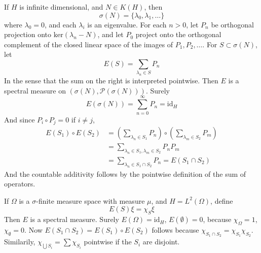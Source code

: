 \begin{example}
    If $H$ is infinite dimensional, and $N \in K(H)$, then
    \[ \sigma(N) = \{ \lambda_0, \lambda_1, \dots \} \]
    where $\lambda_0 = 0$, and each $\lambda_i$ is an eigenvalue. For each $n > 0$, let $P_n$ be orthogonal projection onto $\text{ker}(\lambda_n - N)$, and let $P_0$ project onto the orthogonal complement of the closed linear space of the images of $P_1, P_2, \dots$. For $S \subset \sigma(N)$, let
    \[ E(S) = \sum_{\lambda_n \in S} P_n \]
    In the sense that the sum on the right is interpreted pointwise. Then $E$ is a spectral measure on $(\sigma(N), \mathcal{P}(\sigma(N)))$. Surely
    \[ E(\sigma(N)) = \sum_{n = 0}^\infty P_n = \text{id}_H \]
    And since $P_i \circ P_j = 0$ if $i \neq j$,
    \begin{align*}
        E(S_1) \circ E(S_2) &= \left( \sum_{\lambda_n \in S_1} P_n \right) \circ  \left( \sum_{\lambda_m \in S_2} P_m \right)\\
        &= \sum_{\lambda_n \in S_1, \lambda_m \in S_2} P_n P_m\\
        &= \sum_{\lambda_n \in S_1 \cap S_2} P_n = E(S_1 \cap S_2)
    \end{align*}
    And the countable additivity follows by the pointwise definition of the sum of operators.
\end{example}

\begin{example}
    If $\Omega$ is a $\sigma$-finite measure space with measure $\mu$, and $H = L^2(\Omega)$, define
    \[ E(S) \xi = \chi_S \xi \]
    Then $E$ is a spectral measure. Surely $E(\Omega) = \text{id}_H$, $E(\emptyset) = 0$, because $\chi_\Omega = 1$, $\chi_\emptyset = 0$. Now $E(S_1 \cap S_2) = E(S_1) \circ E(S_2)$ follows because $\chi_{S_1 \cap S_2} = \chi_{S_1} \chi_{S_2}$. Similarily, $\chi_{\bigcup S_i} = \sum \chi_{S_i}$ pointwise if the $S_i$ are disjoint.
\end{example}


